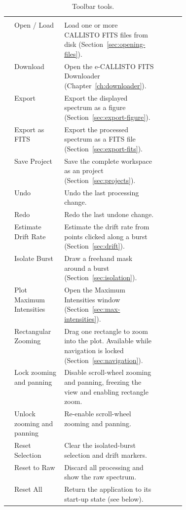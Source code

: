 \begin{xltabular}{\linewidth}{@{}c P{0.28\linewidth} L P{0.14\linewidth}@{}}
  \caption{Toolbar tools.}\label{tab:toolbar}\\
  \toprule
   &  &  &  \\
  \midrule
  \endfirsthead
  \toprule
   &  &  &  \\
  \midrule
  \endhead
   & Open / Load & Load one or more CALLISTO FITS files from disk (Section~\ref{sec:opening-files}). &  \\
   & Download & Open the e-CALLISTO FITS Downloader (Chapter~\ref{ch:downloader}). & \\
   & Export & Export the displayed spectrum as a figure (Section~\ref{sec:export-figure}). &  \\
   & Export as FITS & Export the processed spectrum as a FITS file (Section~\ref{sec:export-fits}). &  \\
   & Save Project & Save the complete workspace as an  project (Section~\ref{sec:projects}). &  \\
   & Undo & Undo the last processing change. &  \\
   & Redo & Redo the last undone change. &  \\
   & Estimate Drift Rate & Estimate the drift rate from points clicked along a burst (Section~\ref{sec:drift}). & \\
   & Isolate Burst & Draw a freehand mask around a burst (Section~\ref{sec:isolation}). & \\
   & Plot Maximum Intensities & Open the Maximum Intensities window (Section~\ref{sec:max-intensities}). & \\
   & Rectangular Zooming & Drag one rectangle to zoom into the plot. Available while navigation is locked (Section~\ref{sec:navigation}). & \\
   & Lock zooming and panning & Disable scroll-wheel zooming and panning, freezing the view and enabling rectangle zoom. & \\
   & Unlock zooming and panning & Re-enable scroll-wheel zooming and panning. & \\
   & Reset Selection & Clear the isolated-burst selection and drift markers. & \\
   & Reset to Raw & Discard all processing and show the raw spectrum. & \\
   & Reset All & Return the application to its start-up state (see below). & \\
  \bottomrule
\end{xltabular}

